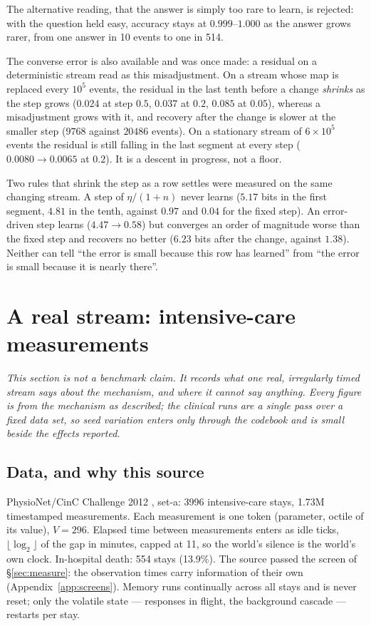 \documentclass[11pt,a4paper]{article}
\theoremstyle{plain}
\theoremstyle{definition}
\theoremstyle{remark}
\begin{document}
The alternative reading, that the answer is simply too rare to learn, is
rejected: with the question held easy, accuracy stays at $0.999$--$1.000$ as the
answer grows rarer, from one answer in 10 events to one in 514.

The converse error is also available and was once made: a residual on a
deterministic stream read as this misadjustment. On a stream whose map is
replaced every $10^5$ events, the residual in the last tenth before a change
\emph{shrinks} as the step grows ($0.024$ at step $0.5$, $0.037$ at $0.2$, $0.085$
at $0.05$), whereas a misadjustment grows with it, and recovery after the change
is slower at the smaller step ($9768$ against $20486$ events). On a stationary
stream of $6\times10^5$ events the residual is still falling in the last segment
at every step ($0.0080\to0.0065$ at $0.2$). It is a descent in progress, not a
floor.

Two rules that shrink the step as a row settles were measured on the same
changing stream. A step of $\eta/(1+n)$ never learns ($5.17$ bits in the first
segment, $4.81$ in the tenth, against $0.97$ and $0.04$ for the fixed step). An
error-driven step learns ($4.47\to0.58$) but converges an order of magnitude
worse than the fixed step and recovers no better ($6.23$ bits after the change,
against $1.38$). Neither can tell ``the error is small because this row has
learned'' from ``the error is small because it is nearly there''.

\section{A real stream: intensive-care measurements}
\label{sec:clinical}

\emph{This section is not a benchmark claim. It records what one real,
irregularly timed stream says about the mechanism, and where it cannot say
anything. Every figure is from the mechanism as described; the clinical runs
are a single pass over a fixed data set, so seed variation enters only through
the codebook and is small beside the effects reported.}

\subsection{Data, and why this source}

PhysioNet/CinC Challenge 2012 \citep{silva2012predicting}, set-a: 3996
intensive-care stays, 1.73M timestamped measurements. Each measurement is one
token (parameter, octile of its value), $V=296$. Elapsed time between
measurements enters as idle ticks, $\lfloor\log_2\rfloor$ of the gap in minutes,
capped at 11, so the world's silence is the world's own clock. In-hospital
death: 554 stays (13.9\%). The source passed the screen of
\S\ref{sec:measure}: the observation times carry information of their own
(Appendix~\ref{app:screens}). Memory runs continually across all stays and is
never reset; only the volatile state --- responses in flight, the background
cascade --- restarts per stay.
\end{document}
